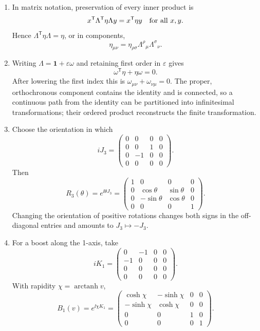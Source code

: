 \begin{enumerate}
\begin{enumerate}
\item
In matrix notation, preservation of every inner product is
\[
 x^{\mathsf T}\Lambda^{\mathsf T}\eta\Lambda y
 =x^{\mathsf T}\eta y
\quad\hbox{for all \(x,y\)}.
\]
Hence
\(\Lambda^{\mathsf T}\eta\Lambda=\eta\), or in components,
\[
 \eta_{\mu\nu}
 =\eta_{\rho\sigma}\Lambda^\rho{}_\mu\Lambda^\sigma{}_\nu.
\]
\item
Writing \(\Lambda=\mathbf1+\varepsilon\omega\) and retaining first order
in \(\varepsilon\) gives
\[
 \omega^{\mathsf T}\eta+\eta\omega=0.
\]
After lowering the first index this is
\(\omega_{\mu\nu}+\omega_{\nu\mu}=0\).  The proper, orthochronous
component contains the identity and is connected, so a continuous path
from the identity can be partitioned into infinitesimal transformations;
their ordered product reconstructs the finite transformation.
\item
Choose the orientation in which
\[
 iJ_3=
 \begin{pmatrix}
 0&0&0&0\\
 0&0&1&0\\
 0&-1&0&0\\
 0&0&0&0
 \end{pmatrix}.
\]
Then
\[
 R_3(\theta)=e^{\ii\theta J_3}
 =
 \begin{pmatrix}
 1&0&0&0\\
 0&\cos\theta&\sin\theta&0\\
 0&-\sin\theta&\cos\theta&0\\
 0&0&0&1
 \end{pmatrix}.
\]
Changing the orientation of positive rotations changes both signs in the
off-diagonal entries and amounts to \(J_3\mapsto-J_3\).
\item
For a boost along the 1-axis, take
\[
 iK_1=
 \begin{pmatrix}
 0&-1&0&0\\
 -1&0&0&0\\
 0&0&0&0\\
 0&0&0&0
 \end{pmatrix}.
\]
With rapidity \(\chi=\operatorname{arctanh}v\),
\[
 B_1(v)=e^{\ii\chi K_1}
 =
 \begin{pmatrix}
 \cosh\chi&-\sinh\chi&0&0\\
 -\sinh\chi&\cosh\chi&0&0\\
 0&0&1&0\\
 0&0&0&1
 \end{pmatrix}.
\]

\end{enumerate}
\end{enumerate}
